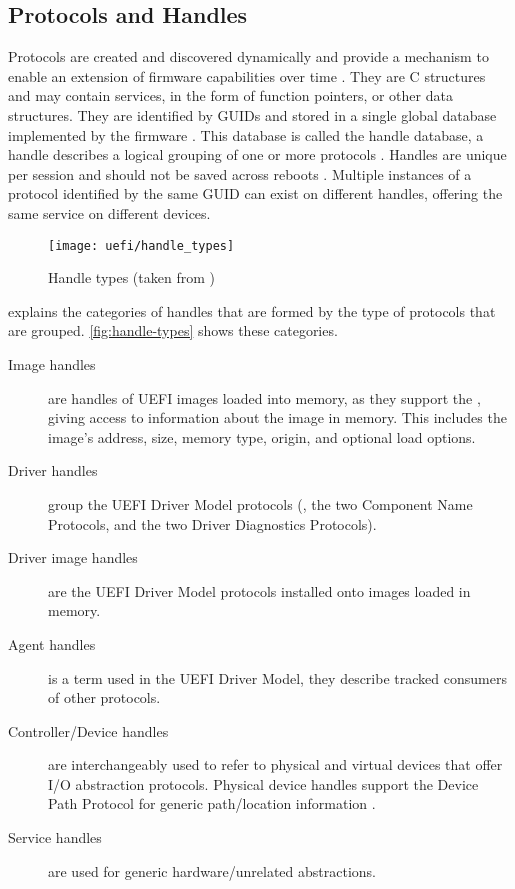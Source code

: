 \subsection{Protocols and Handles}

Protocols are created and discovered dynamically and provide a mechanism to enable an extension of firmware capabilities over time \cite[Section 3.6]{tianocore-edk2-driver-writer-s-guide}.
They are C structures and may contain services, in the form of function pointers, or other data structures.
They are identified by \acp{GUID} and stored in a single global database implemented by the firmware \cite{beyond-bios}.
This database is called the handle database, a handle describes a logical grouping of one or more protocols \cite[Section 3.6]{tianocore-edk2-driver-writer-s-guide}.
Handles are unique per session and should not be saved across reboots \cite{beyond-bios}.
Multiple instances of a protocol identified by the same \ac{GUID} can exist on different handles, offering the same service on different devices.

\begin{figure}[htb]%
    \centering%
    \texttt{[image: uefi/handle\_types]}%
    \caption[Handle types]{Handle types (taken from \cite[Figure 3]{tianocore-edk2-driver-writer-s-guide})}%
    \label{fig:handle-types}%
\end{figure}

\cite{tianocore-edk2-driver-writer-s-guide} explains the categories of handles that are formed by the type of protocols that are grouped. \autoref{fig:handle-types} shows these categories.

\begin{description}
    \item[Image handles] are handles of \ac{UEFI} images loaded into memory, as they support the , giving access to information about the image in memory. This includes the image's address, size, memory type, origin, and optional load options.
    \item[Driver handles] group the \ac{UEFI} Driver Model protocols (, the two Component Name Protocols, and the two Driver Diagnostics Protocols).
    \item[Driver image handles] are the \ac{UEFI} Driver Model protocols installed onto images loaded in memory.
    \item[Agent handles] is a term used in the \ac{UEFI} Driver Model, they describe tracked consumers of other protocols.
    \item[Controller/Device handles] are interchangeably used to refer to physical and virtual devices that offer \ac{I/O} abstraction protocols.
        Physical device handles support the Device Path Protocol for generic path/location information \cite[Section 10.2]{uefi-spec}.
    \item[Service handles] are used for generic hardware\-/unrelated abstractions.
\end{description}

